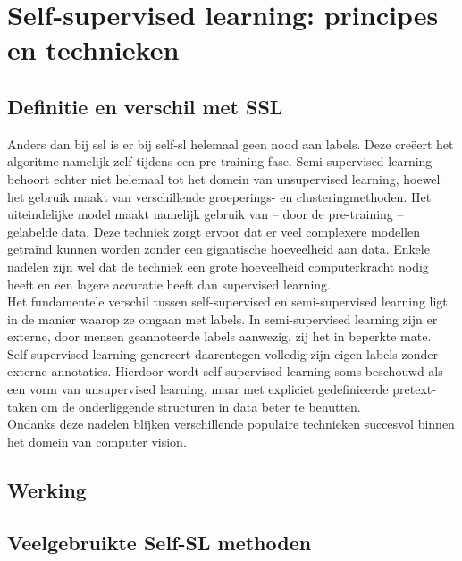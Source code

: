 \section{Self-supervised learning: principes en technieken}

\subsection{Definitie en verschil met SSL}

Anders dan bij \gls{ssl} is er bij \gls{self-sl} helemaal geen nood aan labels. Deze creëert het algoritme namelijk zelf tijdens een pre-training fase. Semi-supervised learning behoort echter niet helemaal tot het domein van unsupervised learning, hoewel het gebruik maakt van verschillende groeperings- en clusteringmethoden. Het uiteindelijke model maakt namelijk gebruik van -- door de pre-training -- gelabelde data. Deze techniek zorgt ervoor dat er veel complexere modellen getraind kunnen worden zonder een gigantische hoeveelheid aan data. Enkele nadelen zijn wel dat de techniek een grote hoeveelheid computerkracht nodig heeft en een lagere accuratie heeft dan supervised learning. \autocite{Gui_2024} \\

Het fundamentele verschil tussen self-supervised en semi-supervised learning ligt in de manier waarop ze omgaan met labels. In semi-supervised learning zijn er externe, door mensen geannoteerde labels aanwezig, zij het in beperkte mate. Self-supervised learning genereert daarentegen volledig zijn eigen labels zonder externe annotaties. Hierdoor wordt self-supervised learning soms beschouwd als een vorm van unsupervised learning, maar met expliciet gedefinieerde pretext-taken om de onderliggende structuren in data beter te benutten. \\

Ondanks deze nadelen blijken verschillende populaire technieken succesvol binnen het domein van computer vision.

\subsection{Werking}

\autocite{Oord_2018}

\lipsum[1]

\subsection{Veelgebruikte Self-SL methoden}

